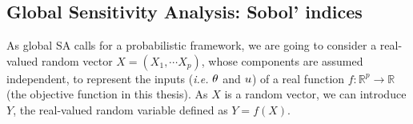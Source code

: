 \documentclass[../../Main_ManuscritThese.tex]{subfiles}
\begin{document}

\subsection{Global Sensitivity Analysis: Sobol' indices}
\label{sec:sobol-indices}
As global SA calls for a probabilistic framework, we are going to
consider a real-valued random vector $X=(X_1,\cdots X_p)$, whose
components are assumed independent, to represent the inputs (\emph{i.e.}
$\theta$ and $u$) of a real function
$f: \mathbb{R}^p\rightarrow \mathbb{R}$ (the objective function in this
thesis). As $X$ is a random vector, we can introduce $Y$, the
real-valued random variable defined as $Y=f(X)$.
\end{document}
